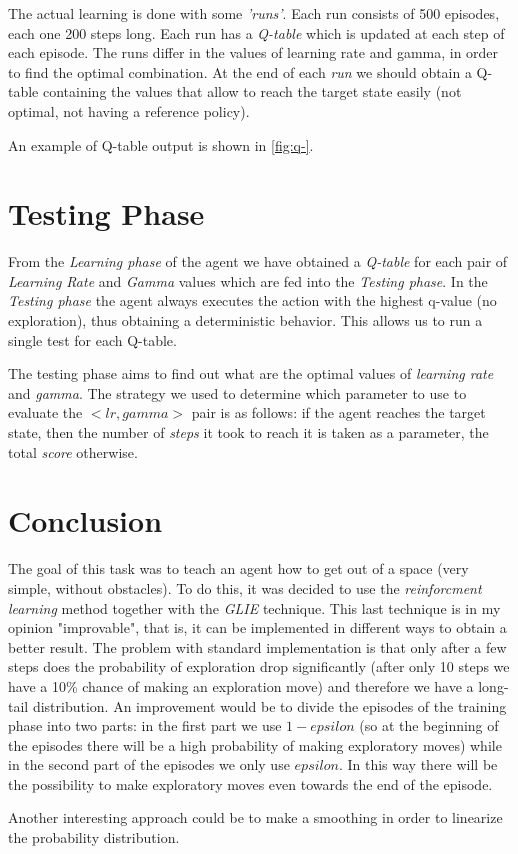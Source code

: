The actual learning is done with some \textit{'runs'}. Each run consists of 500 episodes, each one 200 steps long. Each run has a \textit{Q-table} which is updated at each step of each episode. The runs differ in the values of learning rate and gamma, in order to find the optimal combination. At the end of each \textit{run} we should obtain a Q-table containing the values that allow to reach the target state easily (not optimal, not having a reference policy).

An example of Q-table output is shown in \ref{fig:q-}.

\section{Testing Phase}
From the \textit{Learning phase} of the agent we have obtained a \textit{Q-table} for each pair of \textit{Learning Rate} and \textit{Gamma} values which are fed into the \textit{Testing phase}.
In the \textit{Testing phase} the agent always executes the action with the highest q-value (no exploration), thus obtaining a deterministic behavior. This allows us to run a single test for each Q-table.

The testing phase aims to find out what are the optimal values of \textit{learning rate} and \textit{gamma}. The strategy we used to determine which parameter to use to evaluate the $<lr, gamma>$ pair is as follows: if the agent reaches the target state, then the number of \textit{steps} it took to reach it is taken as a parameter, the total \textit{score} otherwise.


\section{Conclusion}
The goal of this task was to teach an agent how to get out of a space (very simple, without obstacles). To do this, it was decided to use the \textit{reinforcment learning} method together with the \textit{GLIE} technique.
This last technique is in my opinion "improvable", that is, it can be implemented in different ways to obtain a better result. 
The problem with standard implementation is that only after a few steps does the probability of exploration drop significantly (after only 10 steps we have a 10\% chance of making an exploration move) and therefore we have a long-tail distribution. 
An improvement would be to divide the episodes of the training phase into two parts: in the first part we use $1 - epsilon$ (so at the beginning of the episodes there will be a high probability of making exploratory moves) while in the second part of the episodes we only use $epsilon$. In this way there will be the possibility to make exploratory moves even towards the end of the episode.

Another interesting approach  could be to make a smoothing in order to linearize the probability distribution.